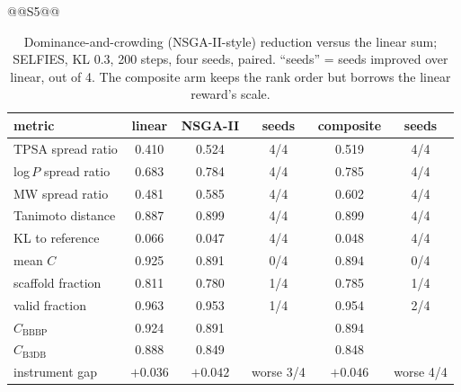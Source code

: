 \documentclass[10pt,letterpaper]{article}
\begin{document}
\begin{table}[!htbp]\centering\small
\caption{Gate arm versus arm A on both corpora, computed from the four \texttt{screened.csv} files of arms A and gate on each corpus. Survivors pass the screen and are not in the (flattened) training corpus; corpus covered = distinct training molecules reproduced / corpus size.}
\label{tab:s4}
\end{table}

\begin{table}[!htbp]\centering\small
\caption{Term ablation per seed (200 steps, KL 0.02; ``none'' is the paired baseline). $\Delta$ scaffold is relative to the same-seed baseline. The collapse screen is scaffold fraction $<0.30$ (arbitrary).}
\label{tab:s5}
@@S5@@
\end{table}

\begin{table}[!htbp]\centering\small
\caption{Screening verdict by arm for every pooled generated molecule (mean reward-ensemble $C$). Undersized molecules score highest in every arm.}
\label{tab:s6}
\end{table}

\begin{table}[!htbp]\centering
\caption{Dominance-and-crowding (NSGA-II-style) reduction versus the linear sum; SELFIES, KL 0.3, 200 steps, four seeds, paired. ``seeds'' = seeds improved over linear, out of 4. The composite arm keeps the rank order but borrows the linear reward's scale.}
\label{tab:s8}
\begin{tabular}{@{}lccccc@{}}\toprule
metric & linear & NSGA-II & seeds & composite & seeds\\\midrule
TPSA spread ratio & 0.410 & 0.524 & 4/4 & 0.519 & 4/4\\
log\,$P$ spread ratio & 0.683 & 0.784 & 4/4 & 0.785 & 4/4\\
MW spread ratio & 0.481 & 0.585 & 4/4 & 0.602 & 4/4\\
Tanimoto distance & 0.887 & 0.899 & 4/4 & 0.899 & 4/4\\
KL to reference & 0.066 & 0.047 & 4/4 & 0.048 & 4/4\\
mean $C$ & 0.925 & 0.891 & 0/4 & 0.894 & 0/4\\
scaffold fraction & 0.811 & 0.780 & 1/4 & 0.785 & 1/4\\
valid fraction & 0.963 & 0.953 & 1/4 & 0.954 & 2/4\\\midrule
$C_{\text{BBBP}}$ & 0.924 & 0.891 & & 0.894 & \\
$C_{\text{B3DB}}$ & 0.888 & 0.849 & & 0.848 & \\
instrument gap & $+0.036$ & $+0.042$ & worse 3/4 & $+0.046$ & worse 4/4\\\bottomrule
\end{tabular}
\end{table}
\end{document}
